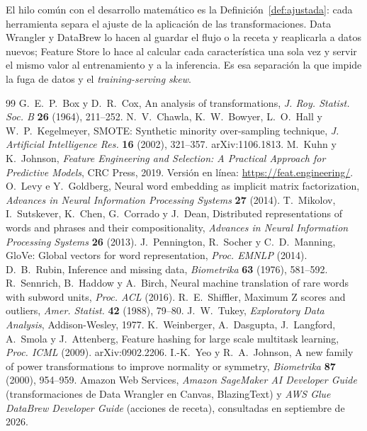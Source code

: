 \documentclass[11pt]{article}
\theoremstyle{definition}
\theoremstyle{remark}
\begin{document}
\noindent El hilo común con el desarrollo matemático es la Definición~\ref{def:ajustada}: cada herramienta separa el ajuste de la aplicación de las transformaciones. Data Wrangler y DataBrew lo hacen al guardar el flujo o la receta y reaplicarla a datos nuevos; Feature Store lo hace al calcular cada característica una sola vez y servir el mismo valor al entrenamiento y a la inferencia. Es esa separación la que impide la fuga de datos y el \emph{training-serving skew}.

\begin{thebibliography}{99}
 G.~E.~P.~Box y D.~R.~Cox, An analysis of transformations, \emph{J. Roy. Statist. Soc. B} \textbf{26} (1964), 211--252.
 N.~V.~Chawla, K.~W.~Bowyer, L.~O.~Hall y W.~P.~Kegelmeyer, SMOTE: Synthetic minority over-sampling technique, \emph{J. Artificial Intelligence Res.} \textbf{16} (2002), 321--357. arXiv:1106.1813.
 M.~Kuhn y K.~Johnson, \emph{Feature Engineering and Selection: A Practical Approach for Predictive Models}, CRC Press, 2019. Versión en línea: \url{https://feat.engineering/}.
 O.~Levy e Y.~Goldberg, Neural word embedding as implicit matrix factorization, \emph{Advances in Neural Information Processing Systems} \textbf{27} (2014).
 T.~Mikolov, I.~Sutskever, K.~Chen, G.~Corrado y J.~Dean, Distributed representations of words and phrases and their compositionality, \emph{Advances in Neural Information Processing Systems} \textbf{26} (2013).
 J.~Pennington, R.~Socher y C.~D.~Manning, GloVe: Global vectors for word representation, \emph{Proc. EMNLP} (2014).
 D.~B.~Rubin, Inference and missing data, \emph{Biometrika} \textbf{63} (1976), 581--592.
 R.~Sennrich, B.~Haddow y A.~Birch, Neural machine translation of rare words with subword units, \emph{Proc. ACL} (2016).
 R.~E.~Shiffler, Maximum Z scores and outliers, \emph{Amer. Statist.} \textbf{42} (1988), 79--80.
 J.~W.~Tukey, \emph{Exploratory Data Analysis}, Addison-Wesley, 1977.
 K.~Weinberger, A.~Dasgupta, J.~Langford, A.~Smola y J.~Attenberg, Feature hashing for large scale multitask learning, \emph{Proc. ICML} (2009). arXiv:0902.2206.
 I.-K.~Yeo y R.~A.~Johnson, A new family of power transformations to improve normality or symmetry, \emph{Biometrika} \textbf{87} (2000), 954--959.
 Amazon Web Services, \emph{Amazon SageMaker AI Developer Guide} (transformaciones de Data Wrangler en Canvas, BlazingText) y \emph{AWS Glue DataBrew Developer Guide} (acciones de receta), consultadas en septiembre de 2026.
\end{thebibliography}
\end{document}
